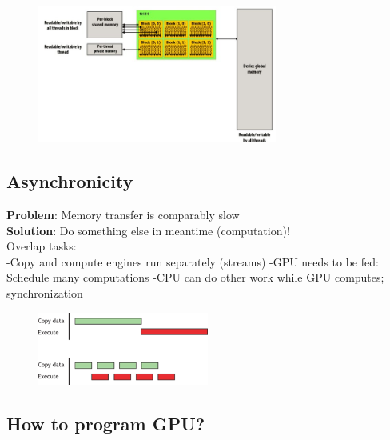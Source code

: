 \begin{figure}[ht]
	\centering
	\includegraphics[width=0.7\textwidth]{figure_parallel/memory.png}
\end{figure}
\FloatBarrier

\subsection{Asynchronicity}

\textbf{Problem}: Memory transfer is comparably slow\\
\textbf{Solution}: Do something else in meantime (computation)!\\
Overlap tasks:\\
-Copy and compute engines run separately (streams)
-GPU needs to be fed: Schedule many computations
-CPU can do other work while GPU computes; synchronization


\begin{figure}[ht]
	\centering
	\includegraphics[width=0.5\textwidth]{figure_parallel/asyncronicity.png}
\end{figure}
\FloatBarrier


\subsection{How to program GPU?}

